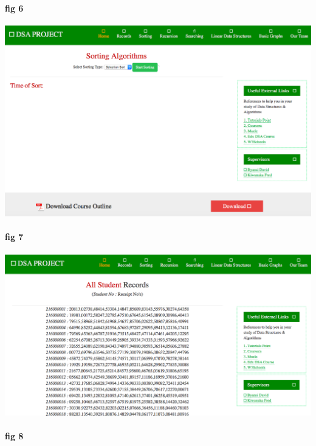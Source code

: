 \documentclass{article}
\begin{document}
\paragraph{fig 6}

\includegraphics[width=1.0\textwidth]{./sort}\\[0.1in]

\paragraph{fig 7}

\includegraphics[width=1.0\textwidth]{./record}\\[0.1in]

\paragraph{fig 8}
\end{document}
